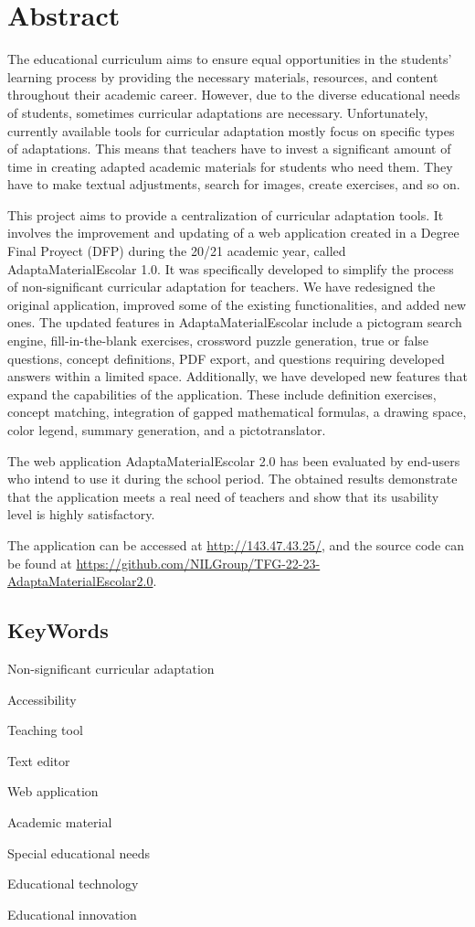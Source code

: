 
\chapter*{Abstract}

The educational curriculum aims to ensure equal opportunities in the students' learning process by providing the necessary materials, resources, and content throughout their academic career. However, due to the diverse educational needs of students, sometimes curricular adaptations are necessary. Unfortunately, currently available tools for curricular adaptation mostly focus on specific types of adaptations. This means that teachers have to invest a significant amount of time in creating adapted academic materials for students who need them. They have to make textual adjustments, search for images, create exercises, and so on.

This project aims to provide a centralization of curricular adaptation tools. It involves the improvement and updating of a web application created in a Degree Final Proyect (DFP) during the 20/21 academic year, called AdaptaMaterialEscolar 1.0. It was specifically developed to simplify the process of non-significant curricular adaptation for teachers. We have redesigned the original application, improved some of the existing functionalities, and added new ones. The updated features in AdaptaMaterialEscolar include a pictogram search engine, fill-in-the-blank exercises, crossword puzzle generation, true or false questions, concept definitions, PDF export, and questions requiring developed answers within a limited space. Additionally, we have developed new features that expand the capabilities of the application. These include definition exercises, concept matching, integration of gapped mathematical formulas, a drawing space, color legend, summary generation, and a pictotranslator.

The web application AdaptaMaterialEscolar 2.0 has been evaluated by end-users who intend to use it during the school period. The obtained results demonstrate that the application meets a real need of teachers and show that its usability level is highly satisfactory.

The application can be accessed at \url{http://143.47.43.25/}, and the source code can be found at \url{https://github.com/NILGroup/TFG-22-23-AdaptaMaterialEscolar2.0}.


\section*{KeyWords}

Non-significant curricular adaptation

Accessibility

Teaching tool

Text editor

Web application

Academic material

Special educational needs

Educational technology

Educational innovation



